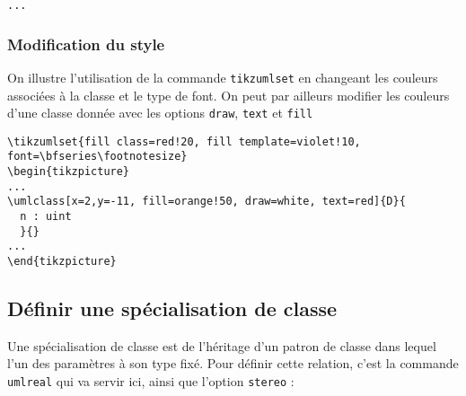 \documentclass[a4paper,11pt]{report}
\newcommand{\inputTikZ}[1]{%
  }%
\newcommand{\inputTikZ}[1]{%
    \texttt{[image: fig/\#1.pdf]}%
  }%
\begin{document}
\medskip

\hspace{-0.7cm}\lstinline{...}
{\color{red!70!black}

}

\begin{center}
\inputTikZ{figure35}
\end{center}

\subsubsection{Modification du style}

On illustre l'utilisation de la commande {\tt tikzumlset} en changeant les couleurs associées à la classe et le type de font. On peut par ailleurs modifier les couleurs d'une classe donnée avec les options {\tt draw}, {\tt text} et {\tt fill}

\medskip

\begin{lstlisting}
\tikzumlset{fill class=red!20, fill template=violet!10, font=\bfseries\footnotesize}
\begin{tikzpicture}
...
\umlclass[x=2,y=-11, fill=orange!50, draw=white, text=red]{D}{
  n : uint
  }{}
...
\end{tikzpicture}
\end{lstlisting}

\begin{center}
\inputTikZ{figure36}
\end{center}

\subsection{Définir une spécialisation de classe}

Une spécialisation de classe est de l'héritage d'un patron de classe dans lequel l'un des paramètres à son type fixé. Pour définir cette relation, c'est la commande {\tt umlreal} qui va servir ici, ainsi que l'option {\tt stereo} :

\medskip

\begin{minipage}{0.5\textwidth}

\end{minipage}
\begin{minipage}{0.5\textwidth}
\begin{center}
\inputTikZ{figure37}
\end{center}
\end{minipage}
\end{document}
